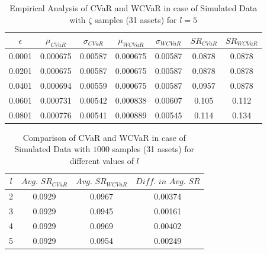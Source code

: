 \documentclass[12pt]{article}
\numberwithin{equation}{section}
\begin{document}
\begin{table}[!h]
    \centering
    \captionsetup{justification=centering}

   \begin{tabular}{||c|c|c|c|c|c|c||}
   \hline
  
$\epsilon$ & $\mu_{CVaR}$ & $\sigma_{CVaR}$ & $\mu_{WCVaR}$ & $\sigma_{WCVaR}$ & $SR_{CVaR}$ & $SR_{WCVaR}$\\
  
  \hline
0.0001 & 0.000675 & 0.00587 & 0.000675 & 0.00587 & 0.0878 & 0.0878 \\
0.0201 & 0.000675 & 0.00587 & 0.000675 & 0.00587 & 0.0878 & 0.0878 \\
0.0401 & 0.000694 & 0.00559 & 0.000675 & 0.00587 & 0.0957 & 0.0878 \\
0.0601 & 0.000731 & 0.00542 & 0.000838 & 0.00607 & 0.105 & 0.112 \\
0.0801 & 0.000776 & 0.00541 & 0.000889 & 0.00545 & 0.114 & 0.134 \\
  \hline
\end{tabular}
    \caption{Empirical Analysis of CVaR and WCVaR in case of Simulated Data with $\zeta$ samples (31 assets) for $l=5$}
    \label{tab:6.2}
\end{table}

\begin{table}[!h]
    \centering
    \captionsetup{justification=centering}

   \begin{tabular}{||c|c|c|c||}
   \hline
  
$l$ & $Avg. \, \, SR_{CVaR}$ & $Avg. \, \, SR_{WCVaR}$ & $Diff. \, \, in \, \, Avg. \, \, SR$ \\
  
  \hline
2 & 0.0929 & 0.0967 & 0.00374 \\
3 & 0.0929 & 0.0945 & 0.00161 \\
4 & 0.0929 & 0.0969 & 0.00402 \\
5 & 0.0929 & 0.0954 & 0.00249 \\
  \hline
\end{tabular}
    \caption{Comparison of CVaR and WCVaR in case of Simulated Data with $1000$ samples (31 assets) for different values of $l$}
    \label{avgtab:6.3}
\end{table}
\end{document}
